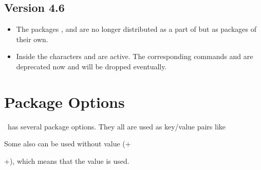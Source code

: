 \documentclass[load-preamble+]{cnltx-doc}
\begin{document}
\subsection{Version 4.6}
\begin{itemize}
  \item The packages \chemformula, \chemgreek{} and \ghsystem{} are no longer
    distributed as a part of \chemmacros{} but as packages of their own.
  \item Inside  the characters \code{\textbar} and
    \code{\textasciicircum} are active.  The corresponding commands
    \cs{\textbar} and \cs{\textasciicircum} are deprecated now and will be
    dropped eventually.
\end{itemize}

\section{Package Options}\label{sec:options}
\chemmacros\ has several package options. They all are used as key/value pairs
like
\begin{sourcecode}
  \usepackage[option1 = <value1>, option2 = <value2>]{chemmacros}
\end{sourcecode}
Some also can be used without value
(\verbcode+\usepackage[option1]{chemmacros}+), which means that the
 value is used.
\end{document}
